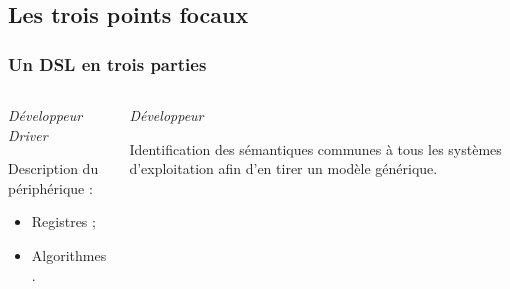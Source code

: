 \documentclass[]{beamer}
\begin{document}
\subsection{Les trois points focaux}
\begin{frame}
\frametitle{Un DSL en trois parties}
\begin{columns}[c]
    \begin{column}[l,T]{115pt}
         {
            \begin{center} \large{\itshape{Développeur Driver}} \end{center}
            \begin{center}
                \setlength\fboxsep{0.5pt}
                \setlength\fboxrule{0.5pt}
            \end{center}
            \scriptsize{
                Description du périphérique :
                \begin{itemize}
                    \item Registres ;
                    \item Algorithmes.
                \end{itemize}
            }
        }
    \end{column}

    \begin{column}[c,T]{115pt}
         {
            \begin{center} \large{\itshape{Développeur \rtx}} \end{center}
            \scriptsize{
                Identification des sémantiques communes à tous les systèmes
                d'exploitation afin d'en tirer un modèle générique.
            }
        }
    \end{column}
    

\end{columns}
\end{frame}
\end{document}
